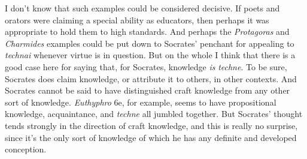 ﻿\documentclass[11pt]{amsart}
\begin{document}

I don't know that such examples could be considered decisive. If poets and orators were claiming a special ability as educators, then perhaps it was appropriate to hold them to high standards. And perhaps the \emph{Protagoras} and \emph{Charmides} examples could be put down to Socrates' penchant for appealing to \emph{technai} whenever virtue is in question. But on the whole I think that there is a good case here for saying that, for Socrates, knowledge \emph{is} \emph{techne}. To be sure, Socrates does claim knowledge, or attribute it to others, in other contexts. And Socrates cannot be said to have distinguished craft knowledge from any other sort of knowledge. \emph{Euthyphro} 6e, for example, seems to have propositional knowledge, acquaintance, and \emph{techne} all jumbled together. But Socrates' thought tends strongly in the direction of craft knowledge, and this is really no surprise, since it's the only sort of knowledge of which he has any definite and developed conception.







\end{document}
